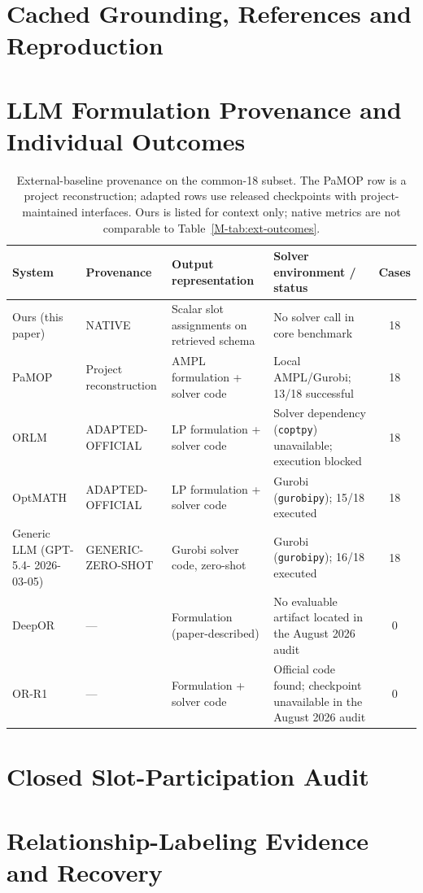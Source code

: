 \documentclass[pdflatex,sn-basic,Numbered]{sn-jnl}
\begin{document}
\section{Cached Grounding, References and Reproduction}
\label{app:grounding-diagnostics}




\FloatBarrier
\section{LLM Formulation Provenance and Individual Outcomes}
\begin{table}[htbp]
  \centering
  \caption{External-baseline provenance on the common-18 subset. The PaMOP row is a project reconstruction; adapted rows use released checkpoints with project-maintained interfaces. Ours is listed for context only; native metrics are not comparable to Table~\ref{M-tab:ext-outcomes}.}
  \label{tab:ext-context}
  \small
  \setlength{\tabcolsep}{3pt}
  \renewcommand{\arraystretch}{1.15}
  \begin{tabular}{@{}>{\raggedright\arraybackslash}p{1.9cm}>{\raggedright\arraybackslash}p{2.6cm}>{\raggedright\arraybackslash}p{2.5cm}>{\raggedright\arraybackslash}p{3.55cm}c@{}}
    \toprule
    System & Provenance & Output representation & Solver environment / status & Cases \\
    \midrule
    Ours (this paper) & NATIVE & Scalar slot assignments on retrieved schema & No solver call in core benchmark & 18 \\
    PaMOP \cite{pan2025pamop} & Project reconstruction & AMPL formulation + solver code & Local AMPL/Gurobi; 13/18 successful & 18 \\
    ORLM \cite{huang2025orlm} & ADAPTED- OFFICIAL & LP formulation + solver code & Solver dependency (\texttt{coptpy}) unavailable; execution blocked & 18 \\
    OptMATH \cite{lu2025optmath} & ADAPTED- OFFICIAL & LP formulation + solver code & Gurobi (\texttt{gurobipy}); 15/18 executed & 18 \\
    Generic LLM (GPT-5.4- 2026-03-05) & GENERIC- ZERO-SHOT & Gurobi solver code, zero-shot & Gurobi (\texttt{gurobipy}); 16/18 executed & 18 \\
    DeepOR \cite{xiao2026deepor} & --- & Formulation (paper-described) & No evaluable artifact located in the August 2026 audit & 0 \\
    OR-R1 \cite{ding2026orr1} & --- & Formulation + solver code & Official code found; checkpoint unavailable in the August 2026 audit & 0 \\
    \bottomrule
  \end{tabular}
\end{table}

\FloatBarrier
\section{Closed Slot-Participation Audit}
\label{app:g3}

\FloatBarrier
\section{Relationship-Labeling Evidence and Recovery}



\end{document}
